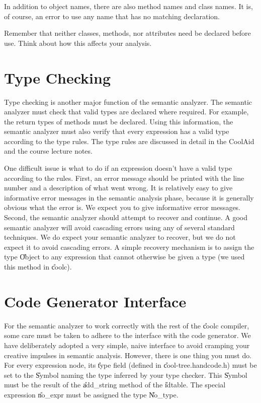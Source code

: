 In addition to object names, there are also method names and class names.
It is, of course, an error to use any name that has no matching declaration.

Remember that neither classes, methods, nor attributes need be
declared before use.  Think about how this affects your analysis.


\section{Type Checking}

Type checking is another major function of the semantic analyzer.
The semantic analyzer must check that valid types are declared where
required.  For example, the return types of methods must be declared.
Using this information, the semantic analyzer must also verify that every
expression has a valid type according to the type rules.  The type rules
are discussed in detail in the CoolAid and the course lecture notes.

One difficult issue is what to do if an expression doesn't have a
valid type according to the rules.  First, an error message should be
printed with the line number and a description of what went wrong.  It
is relatively easy to give informative error messages in the semantic
analysis phase, because it is generally obvious what the error is.  We
expect you to give informative error messages.  Second, the semantic analyzer
should attempt to recover and continue.  A good semantic analyzer
will avoid cascading errors using any of several standard techniques.
We do expect your semantic analyzer to recover, but we do not expect
it to avoid cascading errors.  A simple recovery mechanism is to assign 
the type \U{Object} to any expression that cannot otherwise be given a 
type (we used this method in \U{coolc}).

\section{Code Generator Interface}

For the semantic analyzer to work correctly with the rest of the \U{coolc}
compiler, some care must be taken to adhere to the interface with the
code generator.  We have deliberately adopted a very simple, naive interface to
avoid cramping your creative impulses in semantic analysis.  However, there
is one thing you must do.
For every expression node, its \U{type} field (defined in \U{cool-tree.handcode.h})
must be set to the \U{Symbol} naming the type inferred by your type
checker.  This
\U{Symbol} must be the result of the \U{add\_string} method of the
\U{idtable}.  The special expression \U{no\_expr} must be assigned the
type \U{No\_type}.

